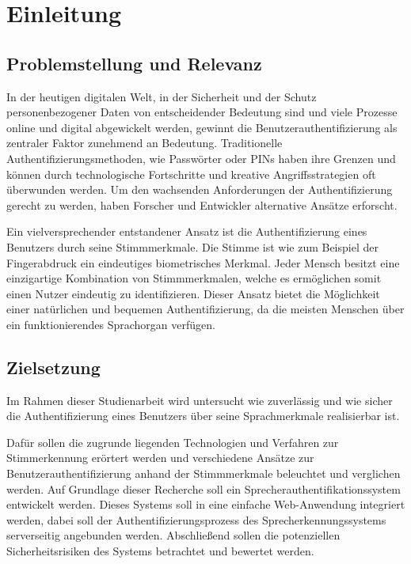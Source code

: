 \section{Einleitung}
\subsection{Problemstellung und Relevanz}

\textauthor{\vLB}{}{}

In der heutigen digitalen Welt, in der Sicherheit und der Schutz personenbezogener Daten von entscheidender Bedeutung sind und viele Prozesse online und digital abgewickelt werden, gewinnt die Benutzerauthentifizierung als zentraler Faktor zunehmend an Bedeutung.
Traditionelle Authentifizierungsmethoden, wie Passwörter oder PINs haben ihre Grenzen und können durch technologische Fortschritte und kreative Angriffsstrategien oft überwunden werden.
Um den wachsenden Anforderungen der Authentifizierung gerecht zu werden, haben Forscher und Entwickler alternative Ansätze erforscht.

Ein vielversprechender entstandener Ansatz ist die Authentifizierung eines Benutzers durch seine Stimmmerkmale.
Die Stimme ist wie zum Beispiel der Fingerabdruck ein eindeutiges biometrisches Merkmal.
Jeder Mensch besitzt eine einzigartige Kombination von Stimmmerkmalen, welche es ermöglichen somit einen Nutzer eindeutig zu identifizieren.
Dieser Ansatz bietet die Möglichkeit einer natürlichen und bequemen Authentifizierung, da die meisten Menschen über ein funktionierendes Sprachorgan verfügen.


\subsection{Zielsetzung}\label{sec:Zielsetzung}

\textauthor{\vLB}{}{}

Im Rahmen dieser Studienarbeit wird untersucht wie zuverlässig und wie sicher die Authentifizierung eines Benutzers über seine Sprachmerkmale realisierbar ist.

Dafür sollen die zugrunde liegenden Technologien und Verfahren zur Stimmerkennung erörtert werden und verschiedene Ansätze zur Benutzerauthentifizierung anhand der Stimmmerkmale beleuchtet und verglichen werden.
Auf Grundlage dieser Recherche soll ein Sprecherauthentifikationssystem entwickelt werden.
Dieses Systems soll in eine einfache Web-Anwendung integriert werden, dabei soll der Authentifizierungsprozess des Sprecherkennungssystems serverseitig angebunden werden.
Abschließend sollen die potenziellen Sicherheitsrisiken des Systems betrachtet und bewertet werden.

